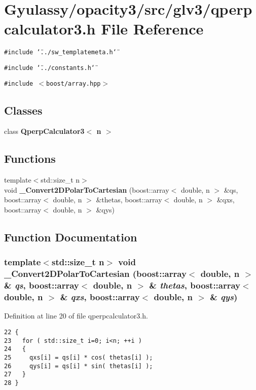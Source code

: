 \section{Gyulassy/opacity3/src/glv3/qperpcalculator3.h File Reference}
\label{qperpcalculator3_8h}
{\tt \#include \char`\"{}../sw\_\-templatemeta.h\char`\"{}}\par
{\tt \#include \char`\"{}../constants.h\char`\"{}}\par
{\tt \#include $<$boost/array.hpp$>$}\par
\subsection*{Classes}
\begin{CompactItemize}
\item 
class {\bf QperpCalculator3$<$ n $>$}
\end{CompactItemize}
\subsection*{Functions}
\begin{CompactItemize}
\item 
{\footnotesize template$<$std::size\_\-t n$>$ }\\void {\bf \_\-Convert2DPolarToCartesian} (boost::array$<$ double, n $>$ \&qs, boost::array$<$ double, n $>$ \&thetas, boost::array$<$ double, n $>$ \&qxs, boost::array$<$ double, n $>$ \&qys)
\end{CompactItemize}


\subsection{Function Documentation}
\subsubsection{\setlength{\rightskip}{0pt plus 5cm}template$<$std::size\_\-t n$>$ void \_\-Convert2DPolarToCartesian (boost::array$<$ double, n $>$ \& {\em qs}, boost::array$<$ double, n $>$ \& {\em thetas}, boost::array$<$ double, n $>$ \& {\em qxs}, boost::array$<$ double, n $>$ \& {\em qys})\hspace{0.3cm}{\tt  [inline]}}\label{qperpcalculator3_8h_38b5c4a624794a33b769d0bb04732f4b}




Definition at line 20 of file qperpcalculator3.h.

\begin{Code}\begin{verbatim}22 {
23   for ( std::size_t i=0; i<n; ++i )
24   {
25     qxs[i] = qs[i] * cos( thetas[i] );
26     qys[i] = qs[i] * sin( thetas[i] );
27   }
28 }
\end{verbatim}
\end{Code}


